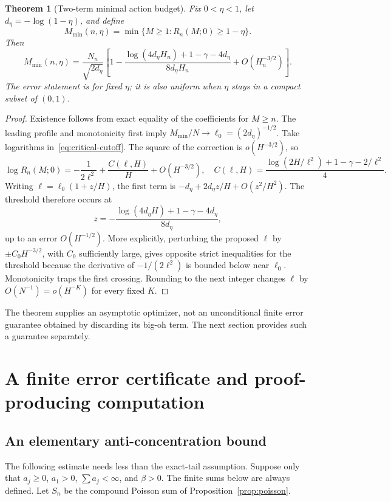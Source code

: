 \documentclass[11pt,a4paper]{article}
\numberwithin{equation}{section}
\newtheorem{theorem}{Theorem}[section]
\theoremstyle{definition}
\theoremstyle{remark}
\begin{document}
\begin{theorem}[Two-term minimal action budget]
\label{thm:min-budget}
Fix \(0<\eta<1\), let \(d_\eta=-\log(1-\eta)\), and define
\[
 M_{\min}(n,\eta)=\min\{M\ge1:R_n(M;0)\ge1-\eta\}.
\]
Then
\begin{equation}
 M_{\min}(n,\eta)=\frac{N_n}{\sqrt{2d_\eta}}
 \left[1-
 \frac{\log(4d_\eta H_n)+1-\gamma-4d_\eta}{8d_\eta H_n}
 +O(H_n^{-3/2})\right].
 \label{eq:min-budget}
\end{equation}
The error statement is for fixed \(\eta\); it is also uniform when
\(\eta\) stays in a compact subset of \((0,1)\).
\end{theorem}
\begin{proof}
Existence follows from exact equality of the coefficients for \(M\ge n\).
The leading profile and monotonicity first imply
\(M_{\min}/N\to\ell_0=(2d_\eta)^{-1/2}\).
Take logarithms in~\eqref{eq:critical-cutoff}. The square of the correction
is \(o(H^{-3/2})\), so
\[
 \log R_n(M;0)=-\frac1{2\ell^2}+\frac{C(\ell,H)}{H}+O(H^{-3/2}),
 \quad C(\ell,H)=\frac{\log(2H/\ell^2)+1-\gamma-2/\ell^2}{4}.
\]
Writing \(\ell=\ell_0(1+z/H)\), the first term is
\(-d_\eta+2d_\eta z/H+O(z^2/H^2)\). The threshold therefore occurs at
\[
 z=-\frac{\log(4d_\eta H)+1-\gamma-4d_\eta}{8d_\eta},
\]
up to an error \(O(H^{-1/2})\). More explicitly, perturbing the proposed
\(\ell\) by \(\pm C_0H^{-3/2}\), with \(C_0\) sufficiently large, gives
opposite strict inequalities for the threshold because the derivative
of \(-1/(2\ell^2)\) is bounded below near \(\ell_0\). Monotonicity traps
the first crossing. Rounding to the next integer changes \(\ell\) by
\(O(N^{-1})=o(H^{-K})\) for every fixed \(K\).
\end{proof}

The theorem supplies an asymptotic optimizer, not an unconditional finite
error guarantee obtained by discarding its big-oh term. The next section
provides such a guarantee separately.

\section{A finite error certificate and proof-producing computation}
\label{sec:certificate}

\subsection{An elementary anti-concentration bound}
The following estimate needs less than the exact-tail assumption. Suppose
only that \(a_j\ge0\), \(a_1>0\), \(\sum a_j<\infty\), and \(\beta>0\).
The finite sums below are always defined. Let \(S_n\) be the compound Poisson
sum of Proposition~\ref{prop:poisson}.
\end{document}
